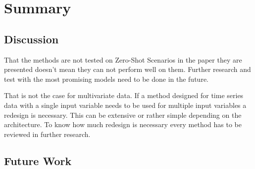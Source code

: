 \section{Summary}\label{discussion}
\subsection{Discussion} \label{discussion:auswertung}
That the methods are not tested on Zero-Shot Scenarios in the paper they are presented doesn't mean they can not perform well on them.  Further research and test with the most promising models need to be done in the future.

That is not the case for multivariate data. If a method designed for time series data with a single input variable needs to be used for multiple input variables a redesign is necessary. This can be extensive or rather simple depending on the architecture. To know how much redesign is necessary every method has to be reviewed in further research.
\subsection{Future Work} \label{discussion:ausblick}

